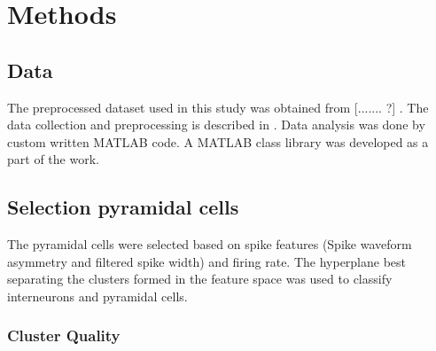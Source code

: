 \chapter{Methods}
\label{analysis}

\section{Data}
The preprocessed dataset used in this study was obtained from [....... ?] . The data collection and preprocessing is described in \citep{Mizuseki2012}. 
Data analysis was done by custom written MATLAB code. A MATLAB class library was developed as a part of the work. 

\section{Selection pyramidal cells}
The pyramidal cells were selected based on spike features (Spike waveform asymmetry and filtered spike width) \cite{Sirota2008} and firing rate. The hyperplane best separating the clusters formed in the feature space was used to classify interneurons and pyramidal cells.

\subsection{Cluster Quality}

